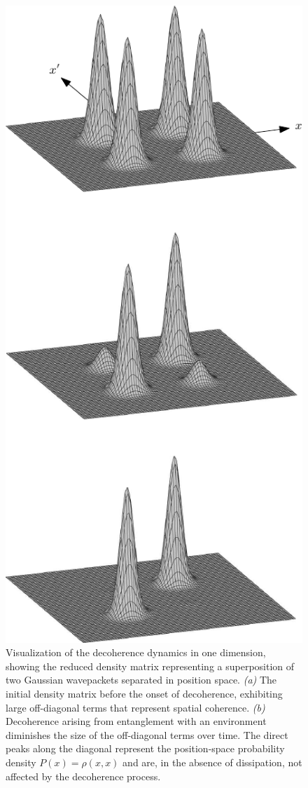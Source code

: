 \documentclass[3p,sort&compress,12pt]{elsarticle}
\begin{document}
\begin{figure}
\includegraphics[scale=.77]{r2.pdf}
\caption{\label{fig:r12}Visualization of the decoherence dynamics in one dimension, showing the reduced density matrix representing a superposition of two Gaussian wavepackets separated in position space. \emph{(a)} The initial density matrix before the onset of decoherence, exhibiting large off-diagonal terms that represent spatial coherence. \emph{(b)} Decoherence arising from entanglement with an environment diminishes the size of the off-diagonal terms over time. The direct peaks along the diagonal represent the position-space probability density $P(x)=\rho(x,x)$ and are, in the absence of dissipation, not affected by the decoherence process.}
\end{figure}
\end{document}
